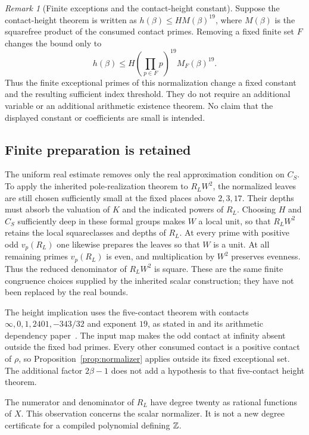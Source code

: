 \documentclass[11pt]{article}
\theoremstyle{remark}\newtheorem{remark}[theorem]{Remark}
\begin{document}
\begin{remark}[Finite exceptions and the contact-height constant]
Suppose the contact-height theorem is written as
$h(\beta)\le H M(\beta)^{19}$, where $M(\beta)$ is the squarefree
product of the consumed contact primes.  Removing a fixed finite
set $F$ changes the bound only to
\[
 h(\beta)\le H\left(\prod_{p\in F}p\right)^{19}
                       M_F(\beta)^{19}.
\]
Thus the finite exceptional primes of this normalization change a
fixed constant and the resulting sufficient index threshold.
They do not require an additional variable or an additional
arithmetic existence theorem.  No claim that the displayed constant
or coefficients are small is intended.
\end{remark}

\subsection{Finite preparation is retained}

The uniform real estimate removes only the real approximation
condition on $C_S$.  To apply the inherited pole-realization theorem
to $R_LW^2$, the normalized leaves are still chosen sufficiently small
at the fixed places above $2,3,17$.  Their depths must absorb the
valuation of $K$ and the indicated powers of $R_L$.  Choosing $H$
and $C_S$ sufficiently deep in these formal groups makes $W$ a local
unit, so that $R_LW^2$ retains the local squareclasses and depths
of $R_L$.  At every prime with positive odd $v_p(R_L)$ one likewise
prepares the leaves so that $W$ is a unit.  At all remaining primes
$v_p(R_L)$ is even, and multiplication by $W^2$ preserves evenness.
Thus the reduced denominator of $R_LW^2$ is square.  These are the
same finite congruence choices supplied by the inherited scalar
construction; they have not been replaced by the real bounds.

The height implication uses the five-contact theorem with contacts
$\infty,0,1,2401,-343/32$ and exponent $19$, as stated in
\cite[Section~1]{Source} and its arithmetic dependency
paper~\cite{Dependencies}.  The input map makes the odd contact
at infinity absent outside the fixed bad primes.  Every other
consumed contact is a positive contact of $\rho$, so
Proposition~\ref{prop:normalizer} applies outside its fixed exceptional
set.  The additional factor $2\beta-1$ does not add a hypothesis
to that five-contact height theorem.

The numerator and denominator of $R_L$ have degree twenty as
rational functions of $X$.  This observation concerns the scalar
normalizer.  It is not a new degree certificate for a compiled
polynomial defining $\mathbb Z$.
\end{document}
